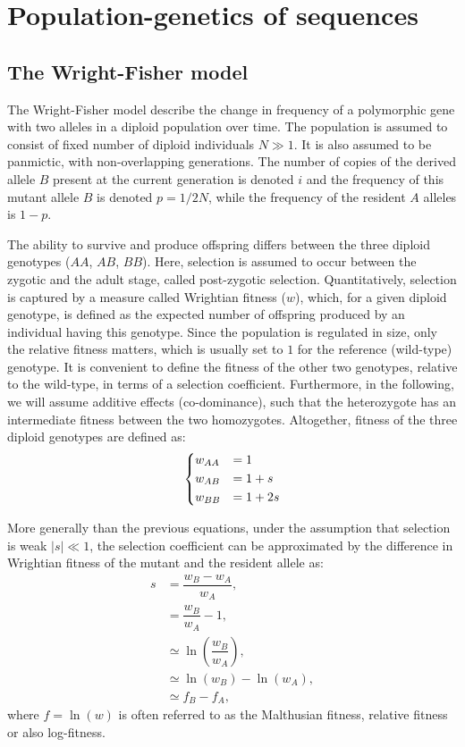 \section{Population-genetics of sequences}

\subsection{The Wright-Fisher model}

The Wright-Fisher model describe the change in frequency of a \gls{polymorphic} gene with two \glspl{allele} in a \gls{diploid} population over time.
The population is assumed to consist of fixed number of diploid individuals $N \gg 1$.
It is also assumed to be panmictic, with non-overlapping generations.
The number of copies of the derived allele $B$ present at the current generation is denoted $i$ and the frequency of this mutant allele $B$ is denoted $p = 1/2N$, while the frequency of the resident $A$ alleles is $1 - p$.

The ability to survive and produce offspring differs between the three diploid genotypes ($AA$, $AB$, $BB$).
Here, selection is assumed to occur between the zygotic and the adult stage, called post-zygotic selection.
Quantitatively, selection is captured by a measure called Wrightian fitness ($w$), which, for a given diploid genotype, is defined as the expected number of offspring produced by an individual having this genotype.
Since the population is regulated in size, only the relative fitness matters, which is usually set to $1$ for the reference (wild-type) genotype.
It is convenient to define the fitness of the other two genotypes, relative to the wild-type, in terms of a selection coefficient.
Furthermore, in the following, we will assume additive effects (co-dominance), such that the heterozygote has an intermediate fitness between the two homozygotes.
Altogether, fitness of the three diploid genotypes are defined as:
\begin{equation}
    \begin{dcases}
        w_{AA} & = 1 \\
        w_{AB} & = 1 + s \\
        w_{BB} & = 1 + 2s \\
    \end{dcases}
\end{equation}

More generally than the previous equations, under the assumption that selection is weak $|s| \ll 1$, the selection coefficient can be approximated by the difference in Wrightian fitness of the mutant and the resident \gls{allele} as:
\begin{align}
    s & = \dfrac{w_{B} - w_{A}}{w_{A}}, \\
    & = \dfrac{w_{B}}{w_{A}} - 1, \\
    & \simeq \ln\left( \dfrac{w_{B}}{w_{A}} \right), \\
    & \simeq \ln(w_{B}) - \ln(w_{A}), \\
    & \simeq f_{B} - f_{A},
\end{align}
where $f = \ln(w)$ is often referred to as the Malthusian fitness, relative fitness or also log-fitness.

